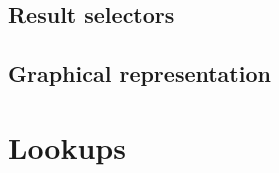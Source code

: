 \subsection{Result selectors}                     \label{shakira: result selectors}  
\subsection{Graphical representation}             \label{shakira: representation}    

\section{Lookups}                                 \label{shakira: lookups}           
